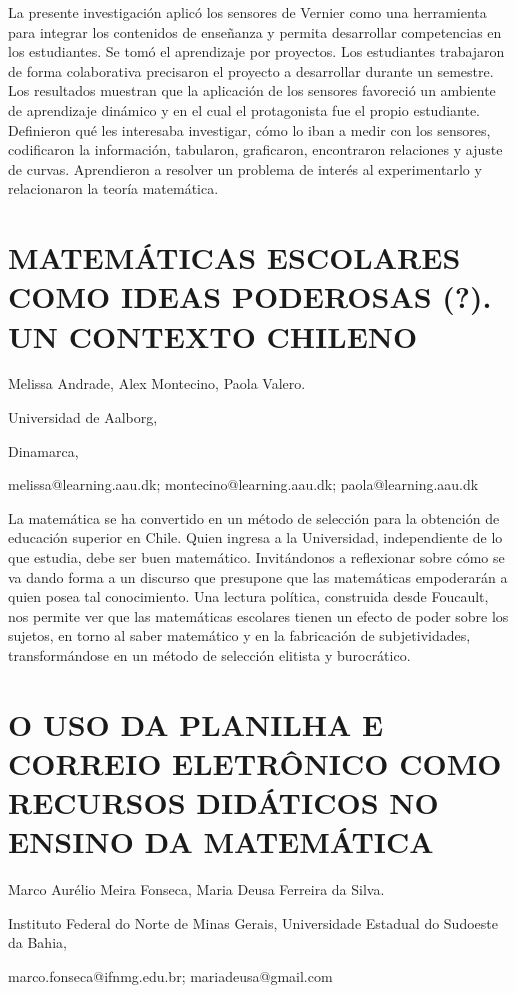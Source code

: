 La presente investigación aplicó los sensores de Vernier como una
herramienta para integrar los contenidos de enseñanza y permita desarrollar
competencias en los estudiantes. Se tomó el aprendizaje por proyectos.
Los estudiantes trabajaron de forma colaborativa precisaron el proyecto
a desarrollar durante un semestre. Los resultados muestran que la
aplicación de los sensores favoreció un ambiente de aprendizaje dinámico
y en el cual el protagonista fue el propio estudiante. Definieron
qué les interesaba investigar, cómo lo iban a medir con los sensores,
codificaron la información, tabularon, graficaron, encontraron relaciones
y ajuste de curvas. Aprendieron a resolver un problema de interés
al experimentarlo y relacionaron la teoría matemática. 


\section{MATEMÁTICAS ESCOLARES COMO IDEAS PODEROSAS (?). UN CONTEXTO CHILENO}

\begin{datos}

Melissa Andrade, Alex Montecino, Paola Valero.

Universidad de Aalborg,

Dinamarca,

melissa@learning.aau.dk; montecino@learning.aau.dk; paola@learning.aau.dk

\end{datos}

La matemática se ha convertido en un método de selección para la obtención
de educación superior en Chile. Quien ingresa a la Universidad, independiente
de lo que estudia, debe ser buen matemático. Invitándonos a reflexionar
sobre cómo se va dando forma a un discurso que presupone que las matemáticas
empoderarán a quien posea tal conocimiento. Una lectura política,
construida desde Foucault, nos permite ver que las matemáticas escolares
tienen un efecto de poder sobre los sujetos, en torno al saber matemático
y en la fabricación de subjetividades, transformándose en un método
de selección elitista y burocrático.


\section{O USO DA PLANILHA E CORREIO ELETRÔNICO COMO RECURSOS DIDÁTICOS NO
ENSINO DA MATEMÁTICA}

\begin{datos}

Marco Aurélio Meira Fonseca, Maria Deusa Ferreira da Silva.

Instituto Federal do Norte de Minas Gerais, Universidade Estadual
do Sudoeste da Bahia,

marco.fonseca@ifnmg.edu.br; mariadeusa@gmail.com

\end{datos}

